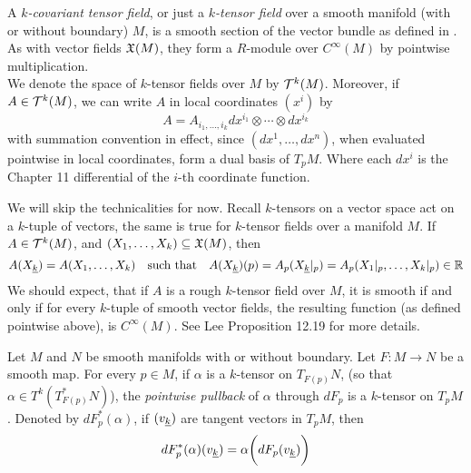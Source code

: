 \documentclass[../main-manifolds.tex]{subfiles}
\begin{document}
\begin{definition}
    A \emph{$k$-covariant tensor field}, or just a \emph{$k$-tensor field} over a smooth manifold (with or without boundary) $M$, is a smooth section of the vector bundle as defined in . As with vector fields $\mathfrak{X}(M)$, they form a $R$-module over $C^\infty(M)$ by pointwise multiplication.\\

    We denote the space of $k$-tensor fields over $M$ by $\mathcal{T}^k(M)$. Moreover, if $A\in \mathcal{T}^k(M)$, we can write $A$ in local coordinates $(x^i)$ by
    \[
        A = A_{i_1,\ldots,i_k}dx^{i_1}\otimes\cdots\otimes dx^{i_k}
    \]
    with summation convention in effect, since $(dx^{1},\ldots,dx^{n})$, when evaluated pointwise in local coordinates, form a dual basis of $T_pM$. Where each $dx^i$ is the Chapter 11 differential of the $i$-th coordinate function.
\end{definition}
We will skip the technicalities for now. Recall $k$-tensors on a vector space act on a $k$-tuple of vectors, the same is true for $k$-tensor fields over a manifold $M$. If $A\in \mathcal{T}^k(M)$, and $(X_1,\ldots, X_k)\subseteq\mathfrak{X}(M)$, then
\[
    A(\Ul{X}[k]) = A(X_1,\ldots,X_k)\quad\text{such that}\quad A(\Ul{X}[k])(p) = A_p(\Ul{X}[k]\vert_{p}) = A_p(X_1\vert_{p},\ldots,X_k\vert_{p})\in\real
\]
We should expect, that if $A$ is a rough $k$-tensor field over $M$, it is smooth if and only if for every $k$-tuple of smooth vector fields, the resulting function (as defined pointwise above), is $C^\infty(M)$. See Lee Proposition 12.19 for more details.


\begin{definition}
    Let $M$ and $N$ be smooth manifolds with or without boundary. Let $F:M\to N$ be a smooth map. For every $p\in M$, if $\alpha$ is a $k$-tensor on $T_{F(p)}N$, (so that $\alpha\in T^k(T_{F(p)}^*N)$), the \emph{pointwise pullback} of $\alpha$ through $dF_p$ is a $k$-tensor on $T_p M$. Denoted by $dF^*_p(\alpha)$, if $(\Ul{v}[k])$ are tangent vectors in $T_pM$, then
    \begin{equation}\label{tensor-field-pointwise-pullback-eq}
        dF^*_p(\alpha)(\Ul{v}[k]) = \alpha\biggl(dF_p(\Ul{v}[k])\biggr)
    \end{equation}
\end{definition}
\end{document}
